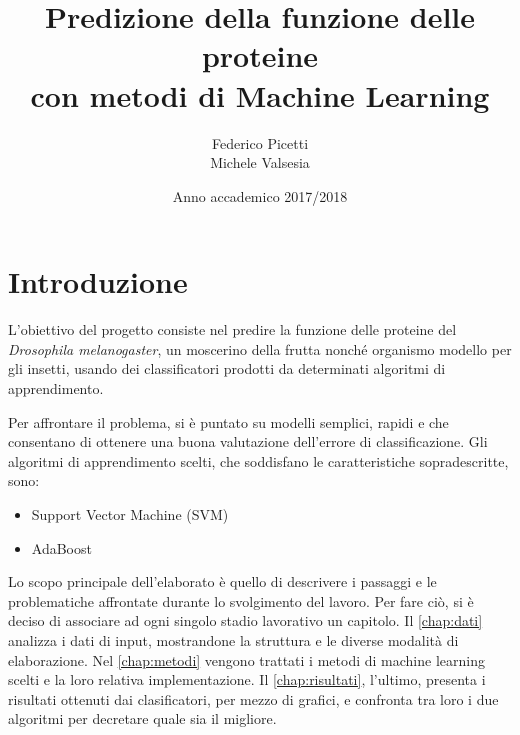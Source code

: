 \documentclass[12pt,a4paper,oneside,hidelinks]{report}
\begin{document}

\title{%
        Predizione della funzione delle proteine \\
        con metodi di Machine Learning}
  
\author{Federico Picetti \\
        Michele Valsesia}

\date{Anno accademico 2017/2018} 

\maketitle

\tableofcontents


\newpage

\section*{Introduzione}
L'obiettivo del progetto consiste nel predire la funzione delle proteine del \textit{Drosophila melanogaster}, un moscerino della frutta nonché organismo modello per gli insetti, usando dei classificatori prodotti da determinati algoritmi di apprendimento.

Per affrontare il problema, si è puntato su modelli semplici, rapidi e che consentano di ottenere una buona valutazione dell'errore di classificazione. Gli algoritmi di apprendimento scelti, che soddisfano le caratteristiche sopradescritte, sono:

\begin{itemize}
    \item Support Vector Machine (SVM)
    \item AdaBoost
\end{itemize}

Lo scopo principale dell'elaborato è quello di descrivere i passaggi e le problematiche affrontate durante lo svolgimento del lavoro. Per fare ciò, si è deciso di associare ad ogni singolo stadio lavorativo un capitolo. Il \autoref{chap:dati} analizza i dati di input, mostrandone la struttura e le diverse modalità di elaborazione.
Nel \autoref{chap:metodi} vengono trattati i metodi di machine learning scelti e la loro relativa implementazione. Il \autoref{chap:risultati}, l'ultimo, presenta i risultati ottenuti dai clasificatori, per mezzo di grafici, e confronta tra loro i due algoritmi per decretare quale sia il migliore.
\end{document}
